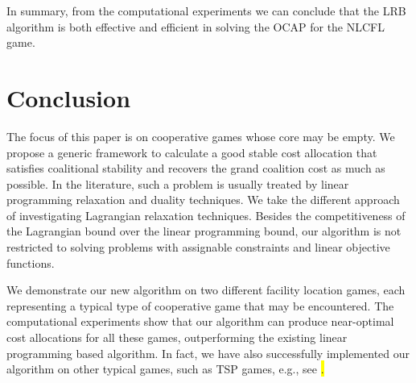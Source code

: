 \documentclass[ijoc,nonblindrev]{informs3} %
\begin{document}
%
%

In summary, from the computational experiments  we can conclude that the LRB algorithm is both effective and efficient in solving the OCAP for the NLCFL game.




\section{Conclusion}\label{sec:conclude}

The focus of this paper is on cooperative games whose core may be empty. We propose a generic framework to calculate a good stable cost allocation that satisfies coalitional stability and recovers the grand coalition cost as much as possible. In the literature, such a problem is usually treated by linear programming relaxation and duality techniques. 
We take the different approach of investigating Lagrangian relaxation techniques. 
Besides the competitiveness of the Lagrangian bound over the linear programming bound, our algorithm is not restricted to solving problems with assignable constraints and linear objective functions.

We demonstrate our new algorithm on two different facility location games, each representing a typical type of cooperative game that may be encountered. The computational experiments show that our algorithm can produce near-optimal cost allocations for all these games, outperforming the existing linear programming based algorithm. In fact, we have also successfully implemented our algorithm on other typical games, such as TSP games, e.g., see \colorbox{yellow}{\cite{liulindongthesis}.}
\end{document}
